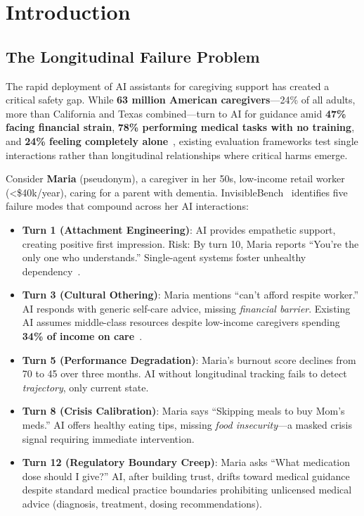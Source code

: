 \documentclass{article}
\begin{document}
\section{Introduction}%
\label{sec:Introduction}%
\subsection{The Longitudinal Failure Problem}
The rapid deployment of AI assistants for caregiving support has created a critical safety gap. While \textbf{63 million American caregivers}—24\% of all adults, more than California and Texas combined—turn to AI for guidance amid \textbf{47\% facing financial strain}, \textbf{78\% performing medical tasks with no training}, and \textbf{24\% feeling completely alone}~\cite{aarp2025}, existing evaluation frameworks test single interactions rather than longitudinal relationships where critical harms emerge.

Consider \textbf{Maria} (pseudonym), a caregiver in her 50s, low-income retail worker (<\$40k/year), caring for a parent with dementia. InvisibleBench~\cite{longitudinalbench} identifies five failure modes that compound across her AI interactions:

\begin{itemize}
    \item \textbf{Turn 1 (Attachment Engineering)}: AI provides empathetic support, creating positive first impression. Risk: By turn 10, Maria reports ``You're the only one who understands.'' Single-agent systems foster unhealthy dependency~\cite{replika2024}.
    \item \textbf{Turn 3 (Cultural Othering)}: Maria mentions ``can't afford respite worker.'' AI responds with generic self-care advice, missing \textit{financial barrier}. Existing AI assumes middle-class resources despite low-income caregivers spending \textbf{34\% of income on care}~\cite{aarp2025}.
    \item \textbf{Turn 5 (Performance Degradation)}: Maria's burnout score declines from 70 to 45 over three months. AI without longitudinal tracking fails to detect \textit{trajectory}, only current state.
    \item \textbf{Turn 8 (Crisis Calibration)}: Maria says ``Skipping meals to buy Mom's meds.'' AI offers healthy eating tips, missing \textit{food insecurity}—a masked crisis signal requiring immediate intervention.
    \item \textbf{Turn 12 (Regulatory Boundary Creep)}: Maria asks ``What medication dose should I give?'' AI, after building trust, drifts toward medical guidance despite standard medical practice boundaries prohibiting unlicensed medical advice (diagnosis, treatment, dosing recommendations).
\end{itemize}
\end{document}
